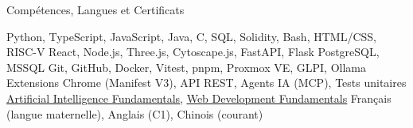 \documentclass[11pt]{cv_template}
\begin{document}
\begin{cv}
\begin{cvsection}{Compétences, Langues et Certificats}

\descitem [Langages :] Python, TypeScript, JavaScript, Java, C, SQL, Solidity, Bash, HTML/CSS, RISC-V
 React, Node.js, Three.js, Cytoscape.js, FastAPI, Flask
 PostgreSQL, MSSQL
 Git, GitHub, Docker, Vitest, pnpm, Proxmox VE, GLPI, Ollama
\descitem [Domaines :] Extensions Chrome (Manifest V3), API REST, Agents IA (MCP), Tests unitaires
 \href{https://www.credly.com/badges/942aa2ea-c60e-4343-9da9-fcaad618f717/public_url}{\underline{Artificial Intelligence Fundamentals}}, \href{https://www.credly.com/badges/f42f2621-21d8-478a-9dae-b04f33677714/public_url}{\underline{Web Development Fundamentals}}
\descitem [Langues :] Français (langue maternelle), Anglais (C1), Chinois (courant)

\end{cvsection}

\end{cv}
\end{document}

